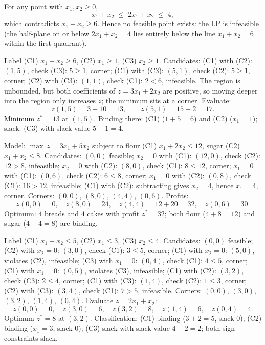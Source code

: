 \begin{solutions}
  \item For any point with $x_{1},x_{2}\ge 0$,
        \[
          x_{1}+x_{2}\;\le\;2x_{1}+x_{2}\;\le\;4,
        \]
        which contradicts $x_{1}+x_{2}\ge 6$. Hence no feasible point
        exists: the LP is infeasible (the half-plane on or below
        $2x_{1}+x_{2}=4$ lies entirely below the line $x_{1}+x_{2}=6$
        within the first quadrant).

  \item Label (C1) $x_{1}+x_{2}\ge 6$, (C2) $x_{1}\ge 1$, (C3)
        $x_{2}\ge 1$. Candidates: (C1) with (C2): $(1,5)$, check
        (C3): $5\ge 1$, corner; (C1) with (C3): $(5,1)$, check (C2):
        $5\ge 1$, corner; (C2) with (C3): $(1,1)$, check (C1):
        $2<6$, infeasible. The region is unbounded, but both
        coefficients of $z=3x_{1}+2x_{2}$ are positive, so moving
        deeper into the region only increases $z$; the minimum sits at
        a corner. Evaluate:
        \[
          z(1,5)=3+10=13,\qquad z(5,1)=15+2=17 .
        \]
        Minimum $z^{*}=13$ at $(1,5)$. Binding there: (C1)
        ($1+5=6$) and (C2) ($x_{1}=1$); slack: (C3) with slack value
        $5-1=4$.

  \item Model: $\max\ z=3x_{1}+5x_{2}$ subject to flour (C1)
        $x_{1}+2x_{2}\le 12$, sugar (C2) $x_{1}+x_{2}\le 8$.
        Candidates: $(0,0)$ feasible; $x_{2}=0$ with (C1): $(12,0)$,
        check (C2): $12>8$, infeasible; $x_{2}=0$ with (C2): $(8,0)$,
        check (C1): $8\le 12$, corner; $x_{1}=0$ with (C1): $(0,6)$,
        check (C2): $6\le 8$, corner; $x_{1}=0$ with (C2): $(0,8)$,
        check (C1): $16>12$, infeasible; (C1) with (C2): subtracting
        gives $x_{2}=4$, hence $x_{1}=4$, corner. Corners: $(0,0)$,
        $(8,0)$, $(4,4)$, $(0,6)$. Profits:
        \[
          z(0,0)=0,\quad z(8,0)=24,\quad z(4,4)=12+20=32,\quad
          z(0,6)=30 .
        \]
        Optimum: $4$ breads and $4$ cakes with profit $z^{*}=32$; both
        flour ($4+8=12$) and sugar ($4+4=8$) are binding.

  \item Label (C1) $x_{1}+x_{2}\le 5$, (C2) $x_{1}\le 3$, (C3)
        $x_{2}\le 4$. Candidates: $(0,0)$ feasible; (C2) with
        $x_{2}=0$: $(3,0)$, check (C1): $3\le 5$, corner; (C1) with
        $x_{2}=0$: $(5,0)$, violates (C2), infeasible; (C3) with
        $x_{1}=0$: $(0,4)$, check (C1): $4\le 5$, corner; (C1) with
        $x_{1}=0$: $(0,5)$, violates (C3), infeasible; (C1) with
        (C2): $(3,2)$, check (C3): $2\le 4$, corner; (C1) with (C3):
        $(1,4)$, check (C2): $1\le 3$, corner; (C2) with (C3):
        $(3,4)$, check (C1): $7>5$, infeasible. Corners: $(0,0)$,
        $(3,0)$, $(3,2)$, $(1,4)$, $(0,4)$. Evaluate
        $z=2x_{1}+x_{2}$:
        \[
          z(0,0)=0,\quad z(3,0)=6,\quad z(3,2)=8,\quad z(1,4)=6,\quad
          z(0,4)=4 .
        \]
        Optimum $z^{*}=8$ at $(3,2)$. Classification: (C1) binding
        ($3+2=5$, slack $0$); (C2) binding ($x_{1}=3$, slack $0$);
        (C3) slack with slack value $4-2=2$; both sign constraints
        slack.
\end{solutions}
